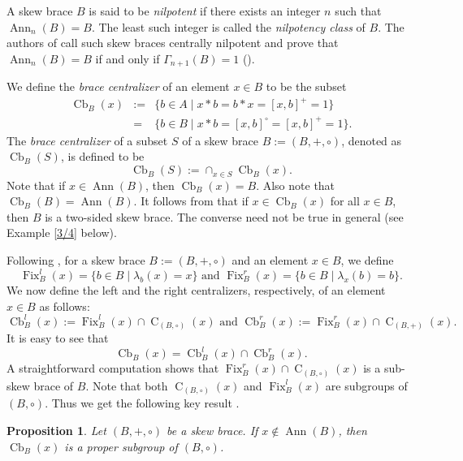 \documentclass[oneside]{amsart}
\numberwithin{equation}{section}
\theoremstyle{plain}
\newtheorem{pro}[equation]{Proposition}
\theoremstyle{definition}
\newcommand{\C}{\operatorname{C} }
\newcommand{\Cb}{\operatorname{Cb} }
\newcommand{\Ann}{\operatorname{Ann} }
\newcommand{\Fix}{\operatorname{Fix} }
\begin{document}
A skew brace $B$ is said to be  {\em nilpotent} if there exists an integer $n$ such that  $\Ann_n(B) = B$. The least such integer is called the  {\em nilpotency class} of $B$.  The authors of \cite{BJ23} call such skew braces centrally nilpotent and prove that   $\Ann_n(B) = B$ if and only if $\Gamma_{n+1}(B) = 1$ (\cite[Theorem 2.8]{BJ23}). 
 


We define the  \emph{brace centralizer} of an element $x \in B$ to be the subset 
\begin{eqnarray*}
\Cb_B(x) &:=&  \{b \in A \mid x * b = b * x = [x, b]^{+} = 1\}\\
&= &\{b \in B \mid x * b = [x, b]^{\circ} = [x, b]^{+} = 1\}.
\end{eqnarray*}
The {\it brace centralizer}  of a subset  $S$ of a skew brace $B := (B, +, \circ)$, denoted as $\Cb_{B}(S)$, is defined to be
$$\Cb_{B}(S) := \cap_{x \in S} \Cb_B(x).$$
 Note that if $x \in \Ann(B)$, then $\Cb_{B}(x) = B$. Also note that $\Cb_{B}(B) = \Ann(B)$. It follows from \cite[Proposition 2.19]{SV18} that if $x \in \Cb_{B}(x)$ for all $x \in B$, then $B$ is a two-sided skew brace. The converse need not be true in general (see Example \ref{3/4} below). 


Following \cite{CFT25}, for a skew brace $B:=(B, +, \circ)$ and an element $x \in B$,  we define 
$$\Fix^l_B(x)  = \{b \in B \mid \lambda_b(x) = x\} \mbox{ and } \Fix^r_B(x)  = \{b \in B \mid \lambda_x(b) = b\}.$$
We now define the left and the right centralizers, respectively, of an element $x \in B$ as follows:
$$\Cb^l_B(x) := \Fix^l_B(x) \cap \C_{(B, \circ)}(x) \mbox{ and }  \Cb^r_B(x) := \Fix^r_B(x) \cap \C_{(B, +)}(x).$$
It is easy to see that 
$$\Cb_B(x) = \Cb^l_B(x) \cap \Cb^r_B(x).$$
 A straightforward computation shows that $\Fix^r_B(x) \cap \C_{(B, \circ)}(x)$ is a sub-skew brace of $B$.  Note that both $\C_{(B, \circ)}(x)$ and $\Fix^l_B(x)$ are subgroups of $(B, \circ)$. Thus we get the following key result \cite[Theorem 3.3]{CFT25}.

\begin{pro}\label{pro:subgroup}
   Let $(B, +, \circ)$ be a skew brace.    If $x \notin \Ann(B)$, then $\Cb_{B}(x)$ is a proper subgroup of  $(B, \circ)$.
\end{pro}
\end{document}
